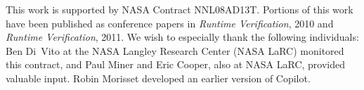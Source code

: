 \documentclass[twocolumn]            %
{report-templates/svjour3}                       %
\begin{document}


%
%
%       
%
%



\begin{acknowledgements}
This work is supported by NASA Contract NNL08AD13T.  Portions
  of this work have been published as conference papers in \emph{Runtime
    Verification}, 2010 and  \emph{Runtime
    Verification}, 2011.  We wish to especially thank the following individuals:
  Ben Di~Vito at the NASA Langley Research Center (NASA LaRC) monitored this
  contract, and Paul Miner and Eric Cooper, also at NASA LaRC, provided valuable
  input.  Robin Morisset developed an earlier version of Copilot.
\end{acknowledgements}


                          

\end{document}
